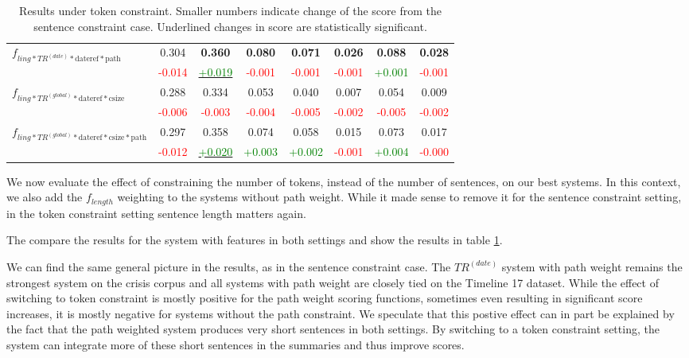 \documentclass[a4paper,BCOR=10mm]{report}
\numberwithin{lemma}{chapter}
\numberwithin{definition}{chapter}
\begin{document}
\begin{table}
\begin{tabular}{|l|c|cc|cc|cc|}
\multirow{2}{*}{$f_{ling*TR^{(date)}*\text{dateref}*\text{path}}$}  & 0.304 & \textbf{0.360}    & \textbf{0.080}    & \textbf{0.071}    & \textbf{0.026}    & \textbf{0.088}    & \textbf{0.028} \\
    & \small \textcolor{red}{-0.014}    & \underline{\small \textcolor{green}{+0.019}}  & \small \textcolor{red}{-0.001}    & \small \textcolor{red}{-0.001}    & \small \textcolor{red}{-0.001}    & \small \textcolor{green}{+0.001}  & \small \textcolor{red}{-0.001} \\\hline
\multirow{2}{*}{$f_{ling*TR^{(global)}*\text{dateref}*\text{csize}}$}   & 0.288 & 0.334 & 0.053 & 0.040 & 0.007 & 0.054 & 0.009 \\
    & \small \textcolor{red}{-0.006}    & \small \textcolor{red}{-0.003}    & \small \textcolor{red}{-0.004}    & \small \textcolor{red}{-0.005}    & \small \textcolor{red}{-0.002}    & \small \textcolor{red}{-0.005}    & \small \textcolor{red}{-0.002} \\\hline
\multirow{2}{*}{$f_{ling*TR^{(global)}*\text{dateref}*\text{csize}*\text{path}}$}   & 0.297 & 0.358 & 0.074 & 0.058 & 0.015 & 0.073 & 0.017 \\
    & \small \textcolor{red}{-0.012}    & \underline{\small \textcolor{green}{+0.020}}  & \small \textcolor{green}{+0.003}  & \small \textcolor{green}{+0.002}  & \small \textcolor{red}{-0.001}    & \small \textcolor{green}{+0.004}  & \small \textcolor{red}{-0.000} \\\hline
\end{tabular}
\caption{Results under token constraint. Smaller numbers indicate change of the score from the sentence constraint case. Underlined changes in score are statistically significant.}
\label{tab:results-token}
\end{table}

We now evaluate the effect of constraining the number of tokens, instead of the number of sentences, on our best systems. In this context, we also add the $f_{length}$ weighting to the systems without path weight. While it made sense to remove it for the sentence constraint setting, in the token constraint setting sentence length matters again.

The compare the results for the system with features in both settings and show the results in table \ref{tab:results-token}.

We can find the same general picture in the results, as in the sentence constraint case. The $TR^{(date)}$ system with path weight remains the strongest system on the crisis corpus and all systems with path weight are closely tied on the Timeline 17 dataset.
While the effect of switching to token constraint is mostly positive for the path weight scoring functions, sometimes even resulting in significant score increases, it is mostly negative for systems without the path constraint. We speculate that this postive effect can in part be explained by the fact that the path weighted system produces very short sentences in both settings. By switching to a token constraint setting, the system can integrate more of these short sentences in the summaries and thus improve scores.
\end{document}
